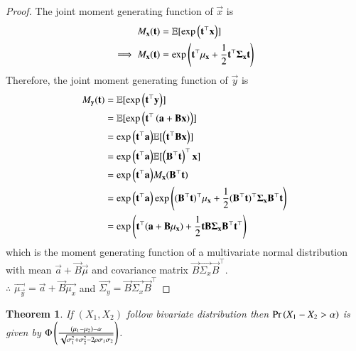 \documentclass[journal,12pt,twocolumn]{IEEEtran}
\newtheorem{theorem}{Theorem}[section]
\begin{document}
\begin{proof}
    The joint moment generating function of $\vec{x}$ is
    \begin{align}
        M_{\mathbf{x}}(\mathbf{t})&=\mathbb{E}[\exp{\ensuremath{\left(\mathbf{t}^{\top}\mathbf{x}\right)}}]\\
        \implies M_{\mathbf{x}}(\mathbf{t})&=\exp{\ensuremath{\left(\mathbf{t}^{\top}\mathbf{\mu_x}+\frac{1}{2}\mathbf{t}^{\top}\mathbf{\Sigma_x}\mathbf{t}\right)}}
    \end{align}
    Therefore, the joint moment generating function of $\vec{y}$ is
    \begin{align}
        M_{\mathbf{y}}(\mathbf{t})&=\mathbb{E}[\exp{\ensuremath{\left(\mathbf{t}^{\top}\mathbf{y}\right)}}]\\
                            &=\mathbb{E}[\exp{\ensuremath{\left(\mathbf{t}^{\top}\left(\mathbf{a}+\mathbf{B}\mathbf{x}\right)\right)}}]\\ &=\exp{\ensuremath{\left(\mathbf{t}^{\top}\mathbf{a}\right)}}\mathbb{E}[\left(\mathbf{t}^{\top}{\mathbf{B}\mathbf{x}}\right)]\\ &=\exp{\ensuremath{\left(\mathbf{t}^{\top}\mathbf{a}\right)}}\mathbb{E}[\left(\mathbf{B}^{\top}\mathbf{t}\right)^{\top}\mathbf{x}]\\
                            &=\exp{\ensuremath{\left(\mathbf{t}^{\top}\mathbf{a}\right)}}M_{\mathbf{x}}(\mathbf{B}^{\top}\mathbf{t})\\
                            &=\exp{\ensuremath{\left(\mathbf{t}^{\top}\mathbf{a}\right)}}\exp{\ensuremath{\left((\mathbf{B}^{\top}\mathbf{t})^{\top}\mathbf{\mu_x}+\frac{1}{2}(\mathbf{B}^{\top}\mathbf{t})^{\top}\mathbf{\Sigma_x}\mathbf{B}^{\top}\mathbf{t}\right)}}\\
                            &=\exp\left(\mathbf{t}^{\top}(\mathbf{a}+\mathbf{B}\mathbf{\mu_x})+\frac{1}{2}\mathbf{t}\mathbf{B}\mathbf{\Sigma_x}\mathbf{B}^{\top}\mathbf{t}^{\top}\right)
    \end{align}
    which is the moment generating function of a multivariate normal distribution with mean $\vec{a}+\vec{B}\vec{\mu}$ and covariance matrix $\vec{B}\vec{\Sigma_x}\vec{B}^{\top}$.\\
    
    $\therefore$ $\vec{\mu_\vec{y}}=\vec{a}+\vec{B}\vec{\mu_x}$ and $\vec{\Sigma_y}=\vec{B}\vec{\Sigma_x}\vec{B}^{\top}$
\end{proof}
\begin{theorem}\label{1.1}
    If $(X_1,X_2)$ follow bivariate distribution then $\Pr\left(X_1-X_2>\alpha\right)$ is given by $\Phi\left(\frac{(\mu_1-\mu_2)-\alpha}{\sqrt{\sigma^2_1+\sigma^2_2-2\rho\sigma_1\sigma_2}}\right)$.
\end{theorem}
\end{document}
